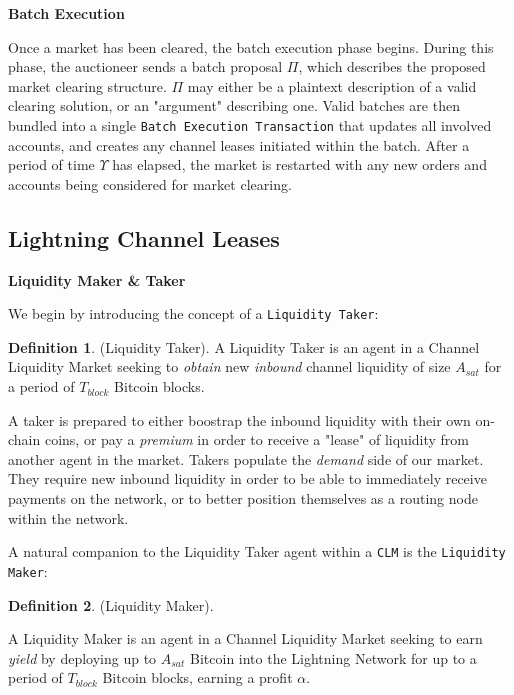 \documentclass[10pt,a4paper]{article}
\theoremstyle{definition}
\newtheorem{definition}{Definition}[section]
\begin{document}
\begin{center}
    \textbf{Batch Execution}
\end{center}

Once a market has been cleared, the batch execution phase begins. During this
phase, the auctioneer sends a batch proposal $\Pi$, which describes the
proposed market clearing structure. $\Pi$ may either be a plaintext description
of a valid clearing solution, or an "argument" describing one. Valid batches
are then bundled into a single \texttt{Batch Execution Transaction} that
updates all involved accounts, and creates any channel leases initiated within
the batch. After a period of time $\Upsilon$ has elapsed, the market is
restarted with any new orders and accounts being considered for market
clearing.

\subsection{Lightning Channel Leases}
\begin{center}
\textbf{Liquidity Maker \& Taker}
\end{center}

We begin by introducing the concept of a \texttt{Liquidity Taker}:

\theoremstyle{definition}

\begin{definition}{(Liquidity Taker).} %
    A Liquidity Taker is an agent in a Channel Liquidity Market seeking to
    \emph{obtain} new \emph{inbound} channel liquidity of size $A_{sat}$ for a
    period of $T_{block}$ Bitcoin blocks.
\end{definition}

A taker is prepared to either boostrap the inbound liquidity with their own
on-chain coins, or pay a \emph{premium} in order to receive a "lease" of
liquidity from another agent in the market. Takers populate the \emph{demand}
side of our market. They require new inbound liquidity in order to be able to
immediately receive payments on the network, or to better position themselves
as a routing node within the network.

A natural companion to the Liquidity Taker agent within a \texttt{CLM} is the
\texttt{Liquidity Maker}:

\theoremstyle{definition}
\begin{definition}{(Liquidity Maker).}

A Liquidity Maker is an agent in a Channel Liquidity Market seeking to earn
\emph{yield} by deploying up to $A_{sat}$ Bitcoin into the Lightning Network
for up to a period of $T_{block}$ Bitcoin blocks, earning a profit $\alpha$.

\end{definition}
\end{document}
